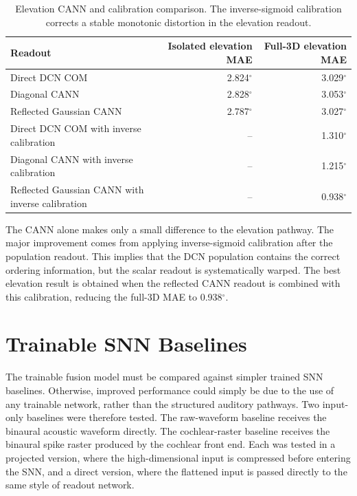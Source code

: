 \begin{table}[H]
    \centering
    \caption{Elevation CANN and calibration comparison. The inverse-sigmoid calibration corrects a stable monotonic distortion in the elevation readout.}
    \label{tab:elevation_cann_results}
    \small
    \begin{tabular}{lrr}
        \toprule
        Readout & Isolated elevation MAE & Full-3D elevation MAE \\
        \midrule
        Direct DCN COM & 2.824$^\circ$ & 3.029$^\circ$ \\
        Diagonal CANN & 2.828$^\circ$ & 3.053$^\circ$ \\
        Reflected Gaussian CANN & 2.787$^\circ$ & 3.027$^\circ$ \\
        Direct DCN COM with inverse calibration & -- & 1.310$^\circ$ \\
        Diagonal CANN with inverse calibration & -- & 1.215$^\circ$ \\
        Reflected Gaussian CANN with inverse calibration & -- & 0.938$^\circ$ \\
        \bottomrule
    \end{tabular}
\end{table}

The CANN alone makes only a small difference to the elevation pathway. The major improvement comes from applying inverse-sigmoid calibration after the population readout. This implies that the DCN population contains the correct ordering information, but the scalar readout is systematically warped. The best elevation result is obtained when the reflected CANN readout is combined with this calibration, reducing the full-3D MAE to 0.938$^\circ$.

\section{Trainable SNN Baselines}

The trainable fusion model must be compared against simpler trained SNN baselines. Otherwise, improved performance could simply be due to the use of any trainable network, rather than the structured auditory pathways. Two input-only baselines were therefore tested. The raw-waveform baseline receives the binaural acoustic waveform directly. The cochlear-raster baseline receives the binaural spike raster produced by the cochlear front end. Each was tested in a projected version, where the high-dimensional input is compressed before entering the SNN, and a direct version, where the flattened input is passed directly to the same style of readout network.

